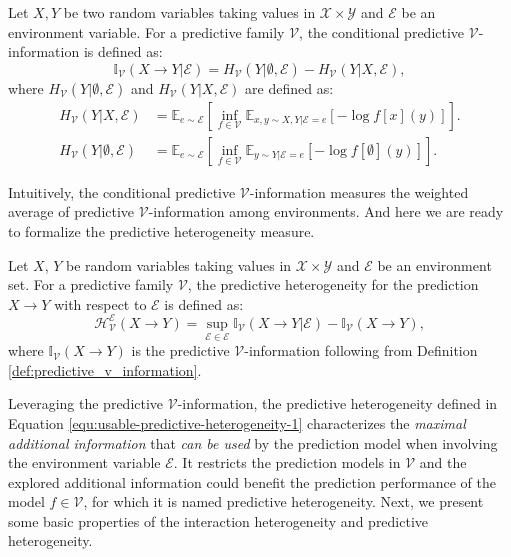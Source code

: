 \begin{definition}
	Let $X, Y$ be two random variables taking values in $\mathcal{X}\times\mathcal{Y}$ and $\mathcal E$ be an environment variable. For a predictive family $\mathcal V$, the conditional predictive $\mathcal V$-information is defined as:
	\begin{equation}
		\mathbb{I}_{\mathcal{V}}(X\rightarrow Y|\mathcal{E}) = H_{\mathcal V}(Y|\emptyset,\mathcal E)-H_{\mathcal V}(Y|X,\mathcal E),
	\end{equation}	
	where $H_{\mathcal V}(Y|\emptyset,\mathcal E)$ and $H_{\mathcal V}(Y|X,\mathcal E)$ are defined as:
	\begin{align}
		H_{\mathcal V}(Y|X,\mathcal E) &= \mathbb E_{e \sim \mathcal E} \left[ \inf\limits_{f\in\mathcal{V}}\mathbb{E}_{x,y\sim X,Y|\mathcal E=e}[-\log f[x](y)]\right]. \\
		H_{\mathcal V}(Y|\emptyset,\mathcal E) &= \mathbb E_{e \sim \mathcal E} \left[ \inf\limits_{f\in\mathcal{V}}\mathbb{E}_{y\sim Y | \mathcal E=e}[-\log f[\emptyset](y)] \right].
	\end{align}	
\end{definition}

Intuitively, the conditional predictive $\mathcal V$-information measures the weighted average of predictive $\mathcal V$-information among environments.
And here we are ready to formalize the predictive heterogeneity measure.


\begin{definition}
	Let $X$, $Y$ be random variables taking values in $\mathcal X \times \mathcal Y$ and $\mathscr E$ be an environment set. For a predictive family $\mathcal V$, the predictive heterogeneity for the prediction $X \rightarrow Y$ with respect to $\mathscr E$ is defined as:
	\begin{equation}
	\label{equ:usable-predictive-heterogeneity-1}
		\mathcal{H}^\mathscr E_{\mathcal V}(X \rightarrow Y) = \sup_{\mathcal{E} \in \mathscr E}\mathbb{I}_{\mathcal{V}}(X\rightarrow Y|\mathcal{E})-\mathbb{I}_{\mathcal{V}}(X\rightarrow Y),
	\end{equation} 
	where $\mathbb{I}_{\mathcal{V}}(X\rightarrow Y)$ is the predictive $\mathcal V$-information following from Definition \ref{def:predictive_v_information}.
\end{definition}

Leveraging the predictive $\mathcal V$-information, the predictive heterogeneity defined in Equation \ref{equ:usable-predictive-heterogeneity-1} characterizes the \emph{maximal additional information} that \emph{can be used} by the prediction model when involving the environment variable $\mathcal E$. 
It restricts the prediction models in $\mathcal{V}$ and the explored additional information could benefit the prediction performance of the model $f\in\mathcal V$, for which it is named predictive heterogeneity. 
Next, we present some basic properties of the interaction heterogeneity and predictive heterogeneity.

